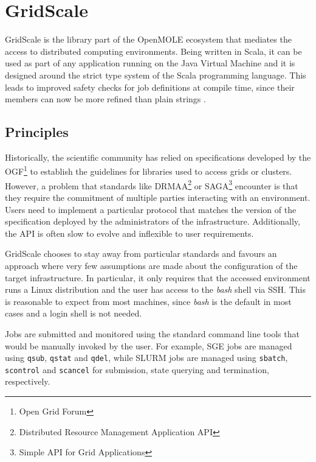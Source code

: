 \section{GridScale} \label{GridScaleSection}

GridScale is the library part of the OpenMOLE ecosystem that mediates the access to distributed computing environments. Being written in Scala, it can be used as part of any application running on the Java Virtual Machine and it is designed around the strict type system of the Scala programming language. This leads to improved safety checks for job definitions at compile time, since their members can now be more refined than plain strings \cite{Reuillon2016}.

\subsection{Principles}

Historically, the scientific community has relied on specifications developed by the OGF\footnote{Open Grid Forum} \cite{OGF} to establish the guidelines for libraries used to access grids or clusters. However, a problem that standards like DRMAA\footnote{Distributed Resource Management Application API} \cite{DRMAA} or SAGA\footnote{Simple API for Grid Applications} \cite{SAGA} encounter is that they require the commitment of multiple parties interacting with an environment. Users need to implement a particular protocol that matches the version of the specification deployed by the administrators of the infrastructure. Additionally, the API is often slow to evolve and inflexible to user requirements.

GridScale chooses to stay away from particular standards and favours an approach where very few assumptions are made about the configuration of the target infrastructure. In particular, it only requires that the accessed environment runs a Linux distribution and the user has access to the \textit{bash} shell via SSH. This is reasonable to expect from most machines, since \textit{bash} is the default in most cases and a login shell is not needed. 

Jobs are submitted and monitored using the standard command line tools that would be manually invoked by the user. For example, SGE jobs are managed using \verb|qsub|, \verb|qstat| and \verb|qdel|, while SLURM jobs are managed using \verb|sbatch|, \verb|scontrol| and \verb|scancel| for submission, state querying and termination, respectively.

